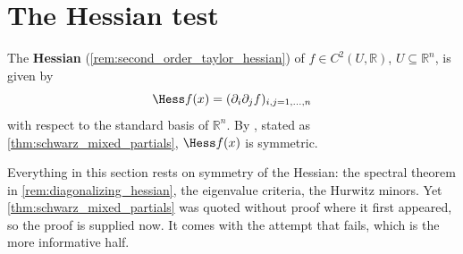 
\section{The Hessian test}
\label{sec:hessian_test}

The \textbf{Hessian} (\cref{rem:second_order_taylor_hessian}) of $f \in C^2(U,\mathbb{R})$,
$U \subseteq \mathbb{R}^n$, is given by
\[\Hess f(x) = (\partial_i\partial_j f)_{i,j=1,\dots,n}\]
with respect to the standard basis of $\mathbb{R}^n$. By 
, stated as \cref{thm:schwarz_mixed_partials},
$\Hess f(x)$ is symmetric.

\begin{remark}
Everything in this section rests on symmetry of the Hessian: the spectral theorem in
\cref{rem:diagonalizing_hessian}, the eigenvalue criteria, the Hurwitz minors. Yet
\cref{thm:schwarz_mixed_partials} was quoted without proof where it first appeared, so the proof
is supplied now. It comes with the attempt that fails, which is the more informative half.
\end{remark}

